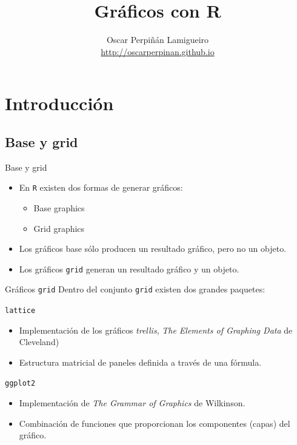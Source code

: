 \documentclass[xcolor={usenames,svgnames,dvipsnames}]{beamer}
\author{Oscar Perpiñán Lamigueiro \\ \url{http://oscarperpinan.github.io}}
\date{}
\title{Gráficos con R}
\begin{document}
\maketitle


\section{Introducción}
\label{sec-1}
\subsection{Base y grid}
\label{sec-1-1}
\begin{frame}[fragile,label=sec-1-1-1]{Base y grid}
 \begin{itemize}
\item En \texttt{R} existen dos formas de generar gráficos:
\begin{itemize}
\item Base graphics
\item Grid graphics
\end{itemize}
\item Los gráficos base sólo producen un resultado gráfico, pero no un objeto.
\item Los gráficos \texttt{grid} generan un resultado gráfico \alert{y} un objeto.
\end{itemize}
\end{frame}

\begin{frame}[fragile,label=sec-1-1-2]{Gráficos \texttt{grid}}
 Dentro del conjunto \texttt{grid} existen dos grandes paquetes:

\begin{block}{\texttt{lattice}}
\begin{itemize}
\item Implementación de los gráficos \emph{trellis}, \emph{The Elements of Graphing Data} de Cleveland)

\item Estructura matricial de paneles definida a través de una fórmula.
\end{itemize}
\end{block}

\begin{block}{\texttt{ggplot2}}
\begin{itemize}
\item Implementación de \emph{The Grammar of Graphics} de Wilkinson.

\item Combinación de funciones que proporcionan los componentes (capas) del gráfico.
\end{itemize}
\end{block}
\end{frame}
\end{document}
